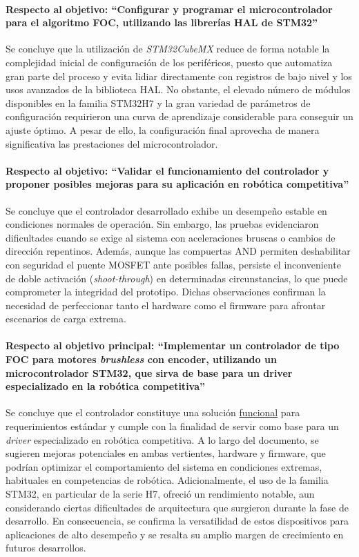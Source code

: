 \documentclass[11pt]{report}
\begin{document}
\paragraph{Respecto al objetivo: ``Configurar y programar el microcontrolador para el algoritmo FOC, utilizando las librerías HAL de STM32''} Se concluye que la utilización de \emph{STM32CubeMX} reduce de forma notable la complejidad inicial de configuración de los periféricos, puesto que automatiza gran parte del proceso y evita lidiar directamente con registros de bajo nivel y los usos avanzados de la biblioteca HAL. No obstante, el elevado número de módulos disponibles en la familia STM32H7 y la gran variedad de parámetros de configuración requirieron una curva de aprendizaje considerable para conseguir un ajuste óptimo. A pesar de ello, la configuración final aprovecha de manera significativa las prestaciones del microcontrolador.

\paragraph{Respecto al objetivo: ``Validar el funcionamiento del controlador y proponer posibles mejoras para su aplicación en robótica competitiva''} Se concluye que el controlador desarrollado exhibe un desempeño estable en condiciones normales de operación. Sin embargo, las pruebas evidenciaron dificultades cuando se exige al sistema con aceleraciones bruscas o cambios de dirección repentinos. Además, aunque las compuertas AND permiten deshabilitar con seguridad el puente MOSFET ante posibles fallas, persiste el inconveniente de doble activación (\emph{shoot-through}) en determinadas circunstancias, lo que puede comprometer la integridad del prototipo. Dichas observaciones confirman la necesidad de perfeccionar tanto el hardware como el firmware para afrontar escenarios de carga extrema.

\paragraph{Respecto al objetivo principal: ``Implementar un controlador de tipo FOC para motores \textit{brushless} con encoder, utilizando un microcontrolador STM32, que sirva de base para un driver especializado en la robótica competitiva''} Se concluye que el controlador constituye una solución \href{https://www.youtube.com/watch?v=XnAQtDEaI2I}{funcional} para requerimientos estándar y cumple con la finalidad de servir como base para un \emph{driver} especializado en robótica competitiva. A lo largo del documento, se sugieren mejoras potenciales en ambas vertientes, hardware y firmware, que podrían optimizar el comportamiento del sistema en condiciones extremas, habituales en competencias de robótica. Adicionalmente, el uso de la familia STM32, en particular de la serie H7, ofreció un rendimiento notable, aun considerando ciertas dificultades de arquitectura que surgieron durante la fase de desarrollo. En consecuencia, se confirma la versatilidad de estos dispositivos para aplicaciones de alto desempeño y se resalta su amplio margen de crecimiento en futuros desarrollos.
\end{document}
